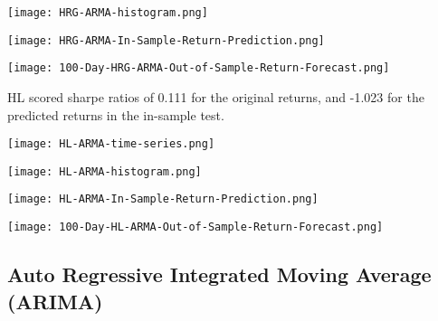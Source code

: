 \begin{center}
    \texttt{[image: HRG-ARMA-histogram.png]}
    \label{fig:nonfloat}
\end{center}

\begin{center}
    \texttt{[image: HRG-ARMA-In-Sample-Return-Prediction.png]}
    \label{fig:nonfloat}
\end{center}

\begin{center}
    \texttt{[image: 100-Day-HRG-ARMA-Out-of-Sample-Return-Forecast.png]}
    \label{fig:nonfloat}
\end{center}

HL scored sharpe ratios of 0.111 for the original returns, and -1.023 for the predicted returns in the in-sample test.

\begin{center}
  
    \texttt{[image: HL-ARMA-time-series.png]}
    \label{fig:nonfloat}
\end{center}

\begin{center}  
    \texttt{[image: HL-ARMA-histogram.png]}
    \label{fig:nonfloat}
\end{center}

\begin{center}
    \texttt{[image: HL-ARMA-In-Sample-Return-Prediction.png]}
    \label{fig:nonfloat}
\end{center}

\begin{center}
    \texttt{[image: 100-Day-HL-ARMA-Out-of-Sample-Return-Forecast.png]}
    \label{fig:nonfloat}
\end{center}

\subsection{Auto Regressive Integrated Moving Average (ARIMA)}

